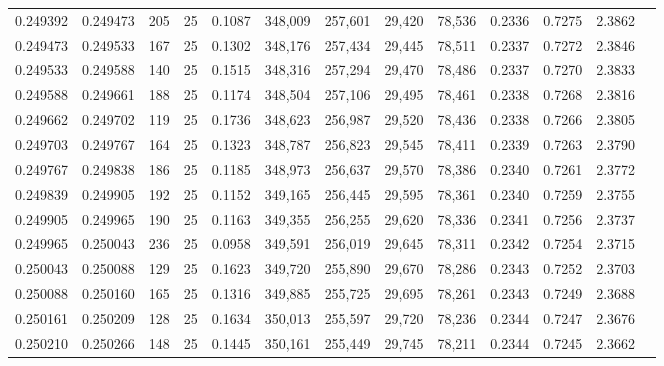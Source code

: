 \begin{tabular}{rrrrrrrrrrrrr}
0.249392 & 0.249473 &   205 &  25 &                                     0.1087 & 348,009 & 257,601 &  29,420 &  78,536 & 0.2336 & 0.7275 & 2.3862 \\
0.249473 & 0.249533 &   167 &  25 &                                     0.1302 & 348,176 & 257,434 &  29,445 &  78,511 & 0.2337 & 0.7272 & 2.3846 \\
0.249533 & 0.249588 &   140 &  25 &                                     0.1515 & 348,316 & 257,294 &  29,470 &  78,486 & 0.2337 & 0.7270 & 2.3833 \\
0.249588 & 0.249661 &   188 &  25 &                                     0.1174 & 348,504 & 257,106 &  29,495 &  78,461 & 0.2338 & 0.7268 & 2.3816 \\
0.249662 & 0.249702 &   119 &  25 &                                     0.1736 & 348,623 & 256,987 &  29,520 &  78,436 & 0.2338 & 0.7266 & 2.3805 \\
0.249703 & 0.249767 &   164 &  25 &                                     0.1323 & 348,787 & 256,823 &  29,545 &  78,411 & 0.2339 & 0.7263 & 2.3790 \\
0.249767 & 0.249838 &   186 &  25 &                                     0.1185 & 348,973 & 256,637 &  29,570 &  78,386 & 0.2340 & 0.7261 & 2.3772 \\
0.249839 & 0.249905 &   192 &  25 &                                     0.1152 & 349,165 & 256,445 &  29,595 &  78,361 & 0.2340 & 0.7259 & 2.3755 \\
0.249905 & 0.249965 &   190 &  25 &                                     0.1163 & 349,355 & 256,255 &  29,620 &  78,336 & 0.2341 & 0.7256 & 2.3737 \\
0.249965 & 0.250043 &   236 &  25 &                                     0.0958 & 349,591 & 256,019 &  29,645 &  78,311 & 0.2342 & 0.7254 & 2.3715 \\
0.250043 & 0.250088 &   129 &  25 &                                     0.1623 & 349,720 & 255,890 &  29,670 &  78,286 & 0.2343 & 0.7252 & 2.3703 \\
0.250088 & 0.250160 &   165 &  25 &                                     0.1316 & 349,885 & 255,725 &  29,695 &  78,261 & 0.2343 & 0.7249 & 2.3688 \\
0.250161 & 0.250209 &   128 &  25 &                                     0.1634 & 350,013 & 255,597 &  29,720 &  78,236 & 0.2344 & 0.7247 & 2.3676 \\
0.250210 & 0.250266 &   148 &  25 &                                     0.1445 & 350,161 & 255,449 &  29,745 &  78,211 & 0.2344 & 0.7245 & 2.3662 \\

\end{tabular}
